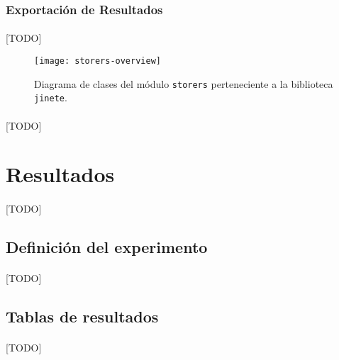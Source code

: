 \documentclass{subfiles}
\begin{document}
        \subsubsection{Exportación de Resultados}
        \label{sec:implementation_components_exportation}

          \paragraph{}
          [TODO]

          \begin{figure}[ht]
            \centering
            \texttt{[image: storers-overview]}
            \caption{Diagrama de clases del módulo \texttt{storers} perteneciente a la biblioteca \texttt{jinete}.}
            \label{img:storers_overview}
          \end{figure}

          \paragraph{}
          [TODO]

    \section{Resultados}
    \label{sec:results}

      \paragraph{}
      [TODO]

      \subsection{Definición del experimento}
      \label{sec:results_definition}

        \paragraph{}
        [TODO]

      \subsection{Tablas de resultados}
      \label{sec:results_tables}

        \paragraph{}
        [TODO]
\end{document}
